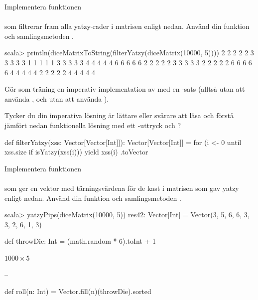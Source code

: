 \Subtask Implementera funktionen \\  \\ som filtrerar fram alla yatzy-rader i matrisen  enligt nedan. Använd din funktion  och samlingsmetoden .
\begin{REPL}
scala> println(diceMatrixToString(filterYatzy(diceMatrix(10000, 5))))
2 2 2 2 2
3 3 3 3 3
1 1 1 1 1
3 3 3 3 3
4 4 4 4 4
6 6 6 6 6
2 2 2 2 2
3 3 3 3 3
2 2 2 2 2
6 6 6 6 6
4 4 4 4 4
2 2 2 2 2
4 4 4 4 4

\end{REPL}



\Subtask Gör som träning en imperativ implementation av  med en -sats (alltså utan att använda , och utan att använda ).


\Subtask\Pen Tycker du din imperativa lösning är lättare eller svårare att läsa och förstå jämfört nedan funktionella lösning med ett -uttryck och ?
\begin{CodeSmall}
def filterYatzy(xss: Vector[Vector[Int]]): Vector[Vector[Int]] = {
  for (i <- 0 until xss.size if isYatzy(xss(i))) yield xss(i)
}.toVector
\end{CodeSmall}

\Subtask Implementera funktionen \\
 \\ som ger en vektor med tärningsvärdena för de kast i matrisen  som gav yatzy enligt nedan. Använd din funktion  och samlingsmetoden .
\begin{REPL}
scala> yatzyPips(diceMatrix(10000, 5))
res42: Vector[Int] = Vector(3, 5, 6, 6, 3, 3, 2, 6, 1, 3)
\end{REPL}




\SOLUTION


\TaskSolved \what


\SubtaskSolved  \begin{Code}
def throwDie: Int = (math.random * 6).toInt + 1
\end{Code}

\SubtaskSolved  $1000 \times 5$

\SubtaskSolved  -- %

\SubtaskSolved  \begin{Code}
def roll(n: Int) = Vector.fill(n)(throwDie).sorted
\end{Code}

